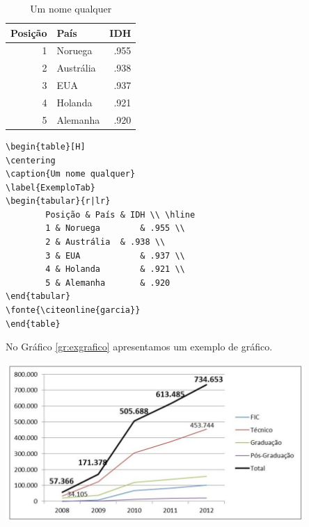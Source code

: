 \begin{table}[H]
\centering
\caption{Um nome qualquer}
\label{ExemploTab}
\begin{tabular}{r|lr}	
Posição & País & IDH \\ \hline
	1 & Noruega        & .955 \\
	2 & Austrália  & .938 \\
	3 & EUA            & .937 \\
	4 & Holanda        & .921 \\
	5 & Alemanha       & .920            %
\end{tabular}
\end{table}




\begin{verbatim}
\begin{table}[H]
\centering
\caption{Um nome qualquer}
\label{ExemploTab}
\begin{tabular}{r|lr}	
    	Posição & País & IDH \\	\hline
    	1 & Noruega        & .955 \\
    	2 & Austrália  & .938 \\
    	3 & EUA            & .937 \\
    	4 & Holanda        & .921 \\
    	5 & Alemanha       & .920 
\end{tabular}
\fonte{\citeonline{garcia}}
\end{table}
\end{verbatim}


\pagebreak

No Gráfico \ref{gr:exgrafico} apresentamos um exemplo de gráfico.

\begin{grafico}[H]
\centering
\caption{Evolução de matrículas dos Institutos Federais}
\includegraphics[height=6cm]{./figuras/redefederal.jpg}	
\label{gr:exgrafico}
\end{grafico}

